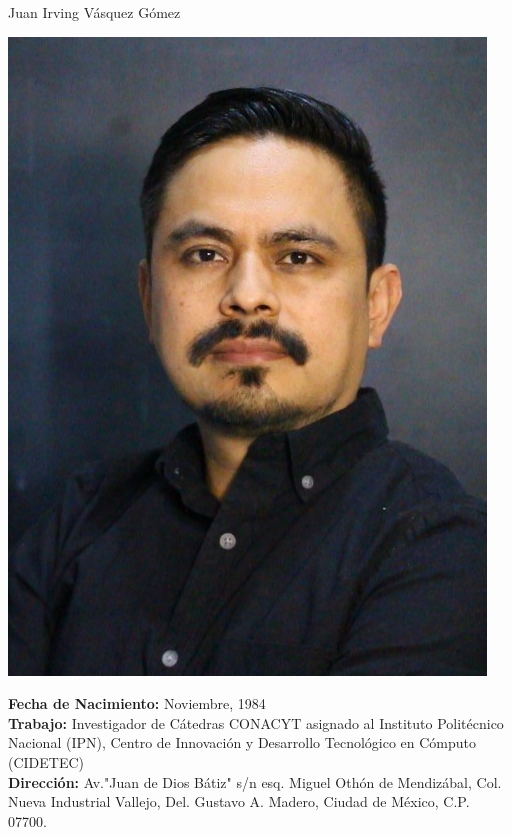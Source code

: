 \documentclass[10pt]{article}
\begin{document}
\begin{center}
{\huge Juan Irving Vásquez Gómez}
\vspace{0.5cm}


\begin{minipage}[b]{0.30\linewidth}
	\centering
	\includegraphics[width=\textwidth]{jivg36}
\end{minipage}
\hspace{0.5cm}
\begin{minipage}[b]{0.65\linewidth}
\textbf{Fecha de Nacimiento:} Noviembre, 1984 \\
\textbf{Trabajo:} Investigador de Cátedras CONACYT asignado al Instituto Politécnico Nacional (IPN), Centro de Innovación y Desarrollo Tecnológico en Cómputo (CIDETEC) \href{https://www.cidetec.ipn.mx/}{\faExternalLink} \\ 
\textbf{Dirección:} Av."Juan de Dios Bátiz" s/n esq. Miguel Othón de Mendizábal, 
Col. Nueva Industrial Vallejo, Del. Gustavo A. Madero, Ciudad de México, C.P. 07700. \\

\end{minipage}
\end{center}
\end{document}
